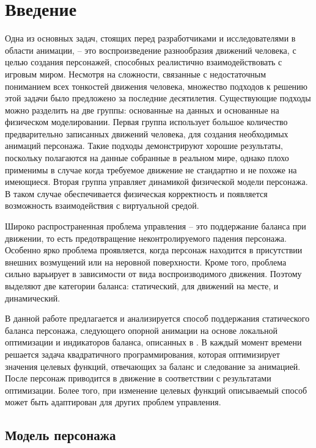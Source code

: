 \section{Введение}

Одна из основных задач, стоящих перед разработчиками и исследователями в области анимации, -- это воспроизведение разнообразия движений человека, с целью  создания персонажей, способных реалистично взаимодействовать с игровым миром. Несмотря на сложности, связанные с недостаточным пониманием всех тонкостей движения человека, множество подходов к решению этой задачи было предложено за последние десятилетия. Существующие подходы можно разделить на две группы: основанные на данных и основанные на физическом моделировании. Первая группа использует большое количество предварительно записанных движений человека, для создания необходимых анимаций персонажа. Такие подходы демонстрируют хорошие результаты, поскольку полагаются на данные собранные в реальном мире, однако плохо применимы в случае когда требуемое движение не стандартно и не похоже на имеющиеся. Вторая группа управляет динамикой физической модели персонажа. В таком случае обеспечивается физическая корректность и появляется возможность взаимодействия с виртуальной средой.

Широко распространенная проблема управления -- это поддержание баланса при движении, то есть предотвращение неконтролируемого падения персонажа. Особенно ярко проблема проявляется, когда персонаж находится в присутствии внешних возмущений или на неровной поверхности. Кроме того, проблема сильно варьирует в зависимости от вида воспроизводимого движения. Поэтому выделяют две категории баланса: статический, для движений на месте, и динамический.

В данной работе предлагается и анализируется способ поддержания статического баланса персонажа, следующего опорной анимации на основе локальной оптимизации и индикаторов баланса, описанных в \cite{MacchiettoZS}. В каждый момент времени решается задача квадратичного программирования, которая оптимизирует значения целевых функций, отвечающих за баланс и следование за анимацией. После персонаж приводится в движение в соответствии с результатами оптимизации. Более того, при изменение целевых функций описываемый способ может быть адаптирован для других проблем управления.

\subsection{Модель персонажа}

